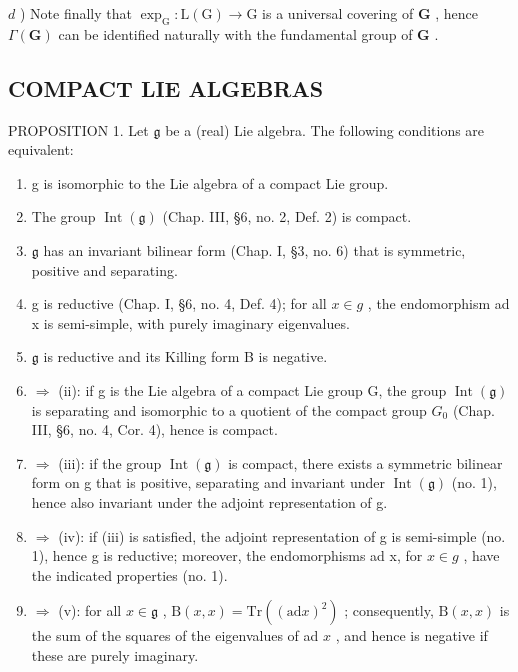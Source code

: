 \(d\) ) Note finally that \(\exp_{\mathrm{G}}:\mathrm{L}(\mathrm{G})\to \mathrm{G}\) is a universal covering of \(\mathbf{G}\) , hence \(\Gamma (\mathbf{G})\) can be identified naturally with the fundamental group of \(\mathbf{G}\) .

\subsection{COMPACT LIE ALGEBRAS}

PROPOSITION 1. Let \(\mathfrak{g}\) be a (real) Lie algebra. The following conditions are equivalent:

\begin{enumerate}
\def\labelenumi{(\roman{enumi})}
\item
  g is isomorphic to the Lie algebra of a compact Lie group.
\item
  The group \(\operatorname{Int}(\mathfrak{g})\) (Chap. III, §6, no. 2, Def. 2) is compact.
\item
  \(\mathfrak{g}\) has an invariant bilinear form (Chap. I, §3, no. 6) that is symmetric, positive and separating.
\item
  g is reductive (Chap. I, §6, no. 4, Def. 4); for all \(x \in g\) , the endomorphism ad x is semi-simple, with purely imaginary eigenvalues.
\item
  \(\mathfrak{g}\) is reductive and its Killing form B is negative.
\item
  \(\Longrightarrow\) (ii): if g is the Lie algebra of a compact Lie group G, the group \(\operatorname{Int}(\mathfrak{g})\) is separating and isomorphic to a quotient of the compact group \(G_{0}\) (Chap. III, §6, no. 4, Cor. 4), hence is compact.
\item
  \(\Longrightarrow\) (iii): if the group \(\operatorname{Int}(\mathfrak{g})\) is compact, there exists a symmetric bilinear form on g that is positive, separating and invariant under \(\operatorname{Int}(\mathfrak{g})\) (no. 1), hence also invariant under the adjoint representation of g.
\item
  \(\Longrightarrow\) (iv): if (iii) is satisfied, the adjoint representation of g is semi-simple (no. 1), hence g is reductive; moreover, the endomorphisms ad x, for \(x \in g\) , have the indicated properties (no. 1).
\item
  \(\Longrightarrow\) (v): for all \(x\in \mathfrak{g}\) , \(\mathrm{B}(x,x) = \mathrm{Tr}((\mathrm{ad}x)^2)\) ; consequently, \(\mathrm{B}(x,x)\) is the sum of the squares of the eigenvalues of ad \(x\) , and hence is negative if these are purely imaginary.

\end{enumerate}
